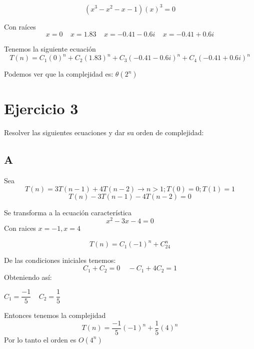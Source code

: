 \documentclass[12pt, fleqn]{article}                             %
\theoremstyle{break}                                            %
\begin{document}
\begin{equation*}
    (x^3-x^2-x-1)(x)^3=0
\end{equation*}

Con raíces
\begin{equation*}
    x=0\:\:\:\:\: x=1.83 \:\:\:\:\: x=-0.41-0.6i \:\:\:\:\: x=-0.41+0.6i
\end{equation*}

Tenemos la siguiente ecuación
\begin{equation*}
   T(n)=C_1(0)^n+C_2(1.83)^n+C_3(-0.41-0.6i)^n+C_4(-0.41+0.6i)^n
\end{equation*}

Podemos ver que la complejidad es:
$\theta(2^n)$



\section{Ejercicio 3}
Resolver las siguientes ecuaciones y dar su orden de complejidad:

    \subsection{A}  
    Sea 
    \begin{equation*}
            T(n)=3T(n-1)+4T(n-2) \rightarrow n>1; T(0)=0; T(1)=1
    \end{equation*}
    \begin{equation*}
    T(n)-3T(n-1)-4T(n-2)=0    
    \end{equation*}

    Se transforma a la ecuación característica
    \begin{equation*}
    x^2-3x-4=0  
    \end{equation*}
    Con raices $x=-1, x=4$

    \begin{equation*}
    T(n)=C_1(-1)^n+C_24^n
    \end{equation*}

    De las condiciones iniciales tenemos:
    \begin{equation*}
        C_1+C_2=0 \:\:\:\:\: -C_1+4C_2=1
    \end{equation*}
    Obteniendo así:


    $C_1=\dfrac{-1}{5} \:\:\:\:\: C_2=\dfrac{1}{5}$

    Entonces tenemos la complejidad
    \begin{equation*}
        T(n)=\dfrac{-1}{5}(-1)^n+\dfrac{1}{5}(4)^n
    \end{equation*}
    Por lo tanto el orden es $O(4^n)$
\end{document}
